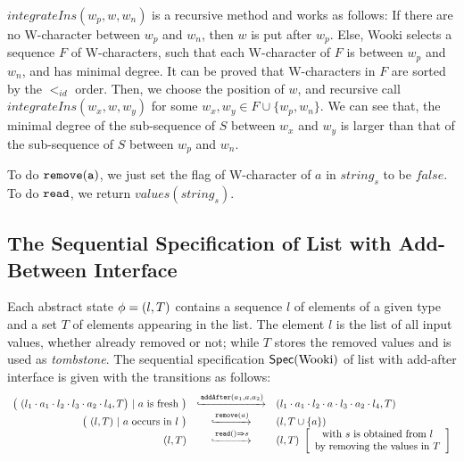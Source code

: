 $integrateIns(w_p,w,w_n)$ is a recursive method and works as follows: If there are no W-character between $w_p$ and $w_n$, then $w$ is put after $w_p$. Else, Wooki selects a sequence $F$ of W-characters, such that each W-character of $F$ is between $w_p$ and $w_n$, and has minimal degree. It can be proved that W-characters in $F$ are sorted by the $<_{id}$ order. Then, we choose the position of $w$, and recursive call $integrateIns(w_x,w,w_y)$ for some $w_x,w_y \in F \cup \{ w_p,w_n \}$. We can see that, the minimal degree of the sub-sequence of $S$ between $w_x$ and $w_y$ is larger than that of the sub-sequence of $S$ between $w_p$ and $w_n$.

To do $\alabelshort[{\tt remove}]{a}$, we just set the flag of W-character of $a$ in $string_s$ to be $\mathit{false}$. To do ${\tt read}$, we return $values(string_s)$.



\subsection{The Sequential Specification of List with Add-Between Interface}
\label{subsec:the sequential specification of list with add-between interface}

Each abstract state $\abstate = (l,T)$ contains a sequence $l$ of elements of a given type and a set $T$ of elements appearing in the list. The element $l$ is the list of all input values, whether already removed or not; while $T$ stores the removed values and is used as \emph{tombstone}. The sequential specification $\specWooki$ of list with add-after interface is given with the transitions as follows:
\[
  \begin{array}{rcl}
    \big(\ (l_1 \cdot a_1 \cdot l_2 \cdot l_3 \cdot a_2 \cdot l_4,T\big)\ |\ a\text{ is fresh}\ \big)
     & \specarrow{\alabelshort[\mathtt{addAfter}]{a_1,a,a_2}}
     & (l_1 \cdot a_1 \cdot l_2 \cdot a \cdot l_3 \cdot a_2 \cdot l_4,T)\\
     \big(\ (l,T)\ |\ a\ \text{occurs in}\ l\ \big)
     & \specarrow{\alabelshort[\mathtt{remove}]{a}}
     & (l,T \cup \{a\})\\
     (l,T)
     & \specarrow{\alabellong[\mathtt{read}]{}{s}{}}
     & (l,T)\
       \left[\begin{array}{c}
           \text{with $s$ is obtained from $l$}\\
           \text{by removing the values in $T$}
       \end{array}\right]
   \end{array}
\]

